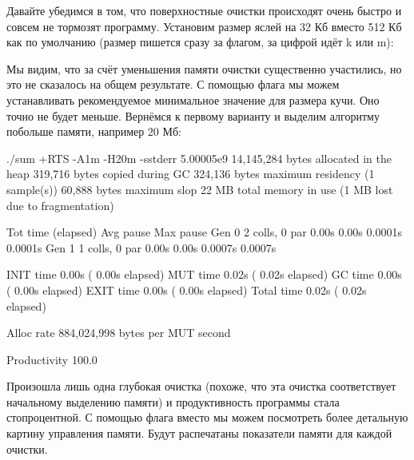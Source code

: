 Давайте убедимся в том, что поверхностные очистки происходят
очень быстро и совсем не тормозят программу. Установим размер яслей
на 32 Кб вместо 512 Кб как по умолчанию (размер пишется сразу за флагом,
за цифрой идёт k или m):


Мы видим, что за счёт уменьшения памяти очистки существенно участились, 
но это не сказалось на общем результате. С помощью флага 
мы можем устанавливать рекомендуемое минимальное значение для размера
кучи. Оно точно не будет меньше. Вернёмся к первому варианту 
и выделим алгоритму побольше памяти, например 20 Мб:

\begin{code}
./sum +RTS -A1m -H20m -sstderr
5.00005e9
      14,145,284 bytes allocated in the heap
         319,716 bytes copied during GC
         324,136 bytes maximum residency (1 sample(s))
          60,888 bytes maximum slop
              22 MB total memory in use (1 MB lost due to fragmentation)

                                    Tot time (elapsed)  Avg pause  Max pause
  Gen  0         2 colls,     0 par    0.00s    0.00s     0.0001s    0.0001s
  Gen  1         1 colls,     0 par    0.00s    0.00s     0.0007s    0.0007s

  INIT    time    0.00s  (  0.00s elapsed)
  MUT     time    0.02s  (  0.02s elapsed)
  GC      time    0.00s  (  0.00s elapsed)
  EXIT    time    0.00s  (  0.00s elapsed)
  Total   time    0.02s  (  0.02s elapsed)


  Alloc rate    884,024,998 bytes per MUT second

  Productivity 100.0%
\end{code}

Произошла лишь одна глубокая очистка (похоже, что 
эта очистка соответствует начальному выделению памяти) и 
продуктивность программы стала стопроцентной. С помощью 
флага  вместо  мы можем посмотреть более 
детальную картину управления памяти. Будут распечатаны 
показатели памяти для каждой очистки. 

